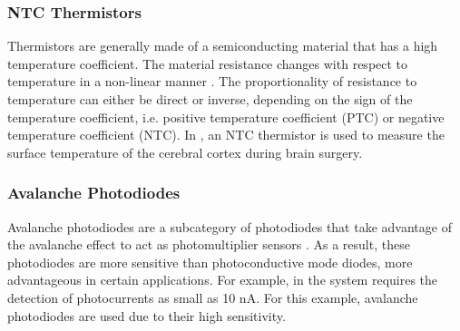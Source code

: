 \subsubsection{NTC Thermistors}
Thermistors are generally made of a semiconducting material that has a high temperature coefficient. The material resistance changes with respect to temperature in a non-linear manner \parencite{ida_sensors_2013}. The proportionality of resistance to temperature can either be direct or inverse, depending on the sign of the temperature coefficient, i.e. positive temperature coefficient (PTC) or negative temperature coefficient (NTC). In \textcite{yamakawa_implantable_2019}, an NTC thermistor is used to measure the surface temperature of the cerebral cortex during brain surgery. 

\subsubsection{Avalanche Photodiodes}
Avalanche photodiodes are a subcategory of photodiodes that take advantage of the avalanche effect to act as photomultiplier sensors \textcite{ida_sensors_2013}. As a result, these photodiodes are more sensitive than photoconductive mode diodes, more advantageous in certain applications. For example, in \textcite{miao_cmos-based_2018} the system requires the detection of photocurrents as small as 10 nA. For this example, avalanche photodiodes are used due to their high sensitivity.  




